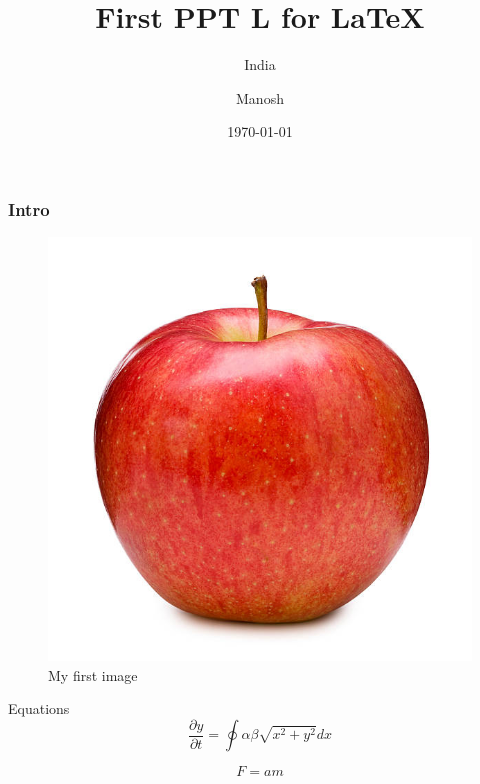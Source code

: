 \documentclass[11pt]{beamer}
\begin{document}
	\author{Manosh}
	\title{First PPT L for \LaTeX}
	\subtitle{India}
	\date{\today}
	\subject{Physics}
	\begin{frame}[plain]
		\maketitle
	\end{frame}
	
	\begin{frame}
		\frametitle{Intro}
	\end{frame}

\begin{frame}
	\begin{figure}
		\includegraphics{images/fig1}
		\caption{My first image}
		\label{fig:1}
	\end{figure}
\end{frame}

\begin{frame}{Equations}
	\begin{equation}
	\frac{\partial y}{\partial t}=\oint\alpha\beta\sqrt{x^2+y^2} dx
	\label{My_eq}
	\end{equation}
	
	\begin{equation}
	F=am
	\label{Eq:1}
	\end{equation}
\end{frame}
\end{document}
